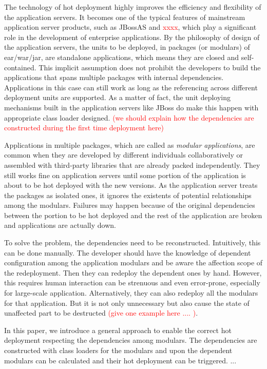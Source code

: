 \documentclass[conference]{IEEEtran}
\begin{document}
The technology of hot deployment highly improves the efficiency and flexibility of the application servers.
It becomes one of the typical features of mainstream application server products, such as JBossAS\cite{jboss} and \textcolor{red}{xxxx}, which play a significant role in the development of enterprise applications. By the philosophy of design of the application servers, the units to be deployed, in packages (or modulars) of ear/war/jar, are standalone applications, which means they are closed and self-contained. This implicit assumption does not prohibit the developers to build the applications that spans multiple packages with internal dependencies. Applications in this case can still work as long as the referencing across different deployment units are supported. As a matter of fact, the unit deploying mechanisms built in the application servers like JBoss do make this happen with appropriate class loader designed.  \textcolor{red}{(we should explain how the dependencies are constructed during the first time deployment here)}

Applications in multiple packages, which are called as \emph{modular applications}, are common when they are developed by different individuals collaboratively or assembled with third-party libraries that are already packed independently. They still works fine on application servers until some portion of the application is about to be hot deployed  with the new versions. As the application server treats the packages as isolated ones, it ignores the existents of potential relationships among the modulars. Failures may happen because of the original dependencies between the portion to be hot deployed and the rest of the application are broken and applications are actually down.

To solve the problem, the dependencies need to be reconstructed. Intuitively, this can be done manually. The developer should have the knowledge of dependent configuration among the application modulars and be aware the affection scope of the redeployment. Then they can redeploy the dependent ones by hand. However, this requires human interaction can be  strenuous and even error-prone, especially for large-scale application. Alternatively, they can also redeploy all the modulars for that application. But it is not only unnecessary but also cause the state of unaffected part to be destructed \textcolor{red}{(give one example here .... )}. 


In this paper, we introduce a general approach to enable the correct hot deployment respecting the dependencies among modulars. The dependencies are constructed with  class loaders for the modulars and upon the dependent modulars can be calculated and  their hot deployment can be triggered. ...
\end{document}
